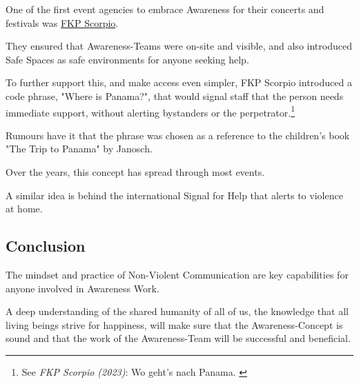 One of the first event agencies to embrace Awareness for their concerts and festivals was \href{https://fkpscorpio.com/}{FKP Scorpio}.

They ensured that Awareness-Teams were on-site and visible, and also introduced Safe Spaces as safe environments for anyone seeking help.

To further support this, and make access even simpler, FKP Scorpio introduced a code phrase, "Where is Panama?", that would signal staff that the person needs immediate support, without alerting bystanders or the perpetrator.\footnote{See \textit{FKP Scorpio (2023)}: Wo geht's nach Panama. \cite{panama}}

Rumours have it that the phrase was chosen as a reference to the children's book "The Trip to Panama" by Janosch.

Over the years, this concept has spread through most events. 

A similar idea is behind the international Signal for Help that alerts to violence at home.

\subsection{Conclusion}

The mindset and practice of Non-Violent Communication are key capabilities for anyone involved in Awareness Work.

A deep understanding of the shared humanity of all of us, the knowledge that all living beings strive for happiness, will make sure that the Awareness-Concept is sound and that the work of the Awareness-Team will be successful and beneficial.
